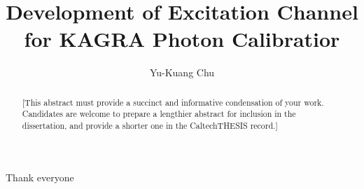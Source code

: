 \documentclass[12pt]{caltech_thesis}
\begin{document}
\title{Development of Excitation Channel for KAGRA Photon Calibratior}
\author{Yu-Kuang Chu}

\address{Taipei, Taiwan}                     %



\maketitle[logo]

\begin{acknowledgements} 	 
  Thank everyone ~~~
\end{acknowledgements}

\begin{abstract}
   [This abstract must provide a succinct and informative condensation of your work. Candidates are welcome to prepare a lengthier abstract for inclusion in the dissertation, and provide a shorter one in the CaltechTHESIS record.]
\end{abstract}

\begin{publishedcontent}%
\nocite{Cahn:etal:2015,Cahn:etal:2016}
\end{publishedcontent}
\end{document}
